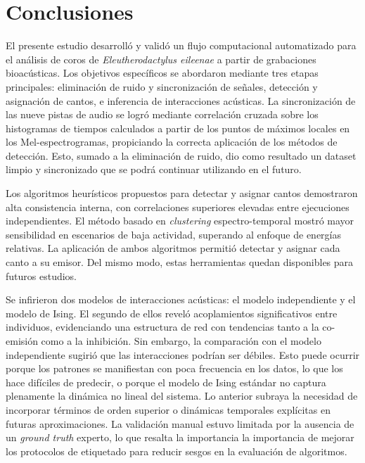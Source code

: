 \chapter*{Conclusiones}\label{chapter:conclusions}


El presente estudio desarrolló y validó un flujo computacional 
automatizado para el análisis de coros de \textit{Eleutherodactylus 
eileenae} a partir de grabaciones bioacústicas. Los objetivos 
específicos se abordaron mediante tres etapas principales: 
eliminación de ruido y sincronización de señales, detección y 
asignación de cantos, e 
inferencia de interacciones acústicas. La sincronización de las 
nueve pistas de audio se logró mediante 
correlación cruzada sobre los histogramas de tiempos calculados a partir de 
los puntos de máximos locales en los Mel-espectrogramas, 
propiciando la correcta aplicación de los métodos de detección.
Esto, sumado a la eliminación de ruido, dio como resultado un 
dataset limpio y sincronizado que se podrá continuar utilizando en el futuro.

Los algoritmos heurísticos propuestos para detectar y asignar 
cantos demostraron alta consistencia interna, con correlaciones 
superiores elevadas entre ejecuciones independientes. El método 
basado en \textit{clustering} espectro-temporal mostró mayor 
sensibilidad en escenarios de baja actividad, superando al 
enfoque de energías relativas. La aplicación de ambos algoritmos 
permitió detectar y asignar cada canto a su emisor. Del mismo 
modo, estas herramientas quedan disponibles para futuros 
estudios.

Se infirieron dos modelos de interacciones acústicas: el modelo 
independiente y el modelo de Ising. El segundo de ellos reveló 
acoplamientos significativos entre individuos, 
evidenciando una estructura de red con tendencias tanto a la 
co-emisión como a la inhibición. Sin embargo, la comparación con 
el modelo independiente sugirió que las interacciones podrían 
ser débiles.  Esto puede ocurrir porque los patrones se manifiestan 
con poca frecuencia 
en los datos, lo que los hace difíciles de predecir, 
o porque el modelo de Ising estándar 
no captura plenamente la dinámica no lineal del sistema. Lo anterior 
subraya la necesidad de incorporar términos de orden superior o 
dinámicas temporales explícitas en futuras aproximaciones. 
La validación manual estuvo limitada por la ausencia de un 
\textit{ground truth} experto, lo que resalta la importancia la 
importancia de mejorar 
los protocolos de etiquetado para reducir sesgos en la 
evaluación de algoritmos.

